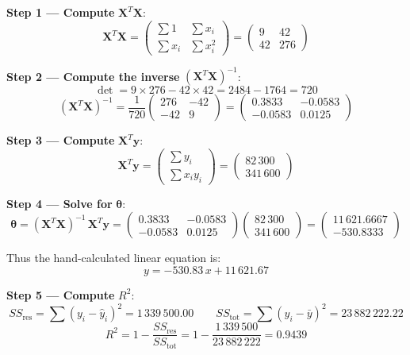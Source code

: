 \documentclass[12pt, a4paper]{article}
\begin{document}
\textbf{Step 1 --- Compute} $\mathbf{X}^T \mathbf{X}$:
\[
\mathbf{X}^T \mathbf{X} =
\begin{pmatrix}
\sum 1 & \sum x_i \\
\sum x_i & \sum x_i^2
\end{pmatrix}
=
\begin{pmatrix}
9 & 42 \\
42 & 276
\end{pmatrix}
\]

\textbf{Step 2 --- Compute the inverse} $(\mathbf{X}^T \mathbf{X})^{-1}$:
\[
\det = 9 \times 276 - 42 \times 42 = 2484 - 1764 = 720
\]
\[
(\mathbf{X}^T \mathbf{X})^{-1} =
\frac{1}{720}
\begin{pmatrix}
276 & -42 \\
-42 & 9
\end{pmatrix}
=
\begin{pmatrix}
0.3833 & -0.0583 \\
-0.0583 & 0.0125
\end{pmatrix}
\]

\textbf{Step 3 --- Compute} $\mathbf{X}^T \mathbf{y}$:
\[
\mathbf{X}^T \mathbf{y} =
\begin{pmatrix}
\sum y_i \\
\sum x_i y_i
\end{pmatrix}
=
\begin{pmatrix}
82\,300 \\
341\,600
\end{pmatrix}
\]

\textbf{Step 4 --- Solve for} $\boldsymbol{\theta}$:
\[
\boldsymbol{\theta} =
(\mathbf{X}^T \mathbf{X})^{-1}\,\mathbf{X}^T \mathbf{y}
=
\begin{pmatrix}
0.3833 & -0.0583 \\
-0.0583 & 0.0125
\end{pmatrix}
\begin{pmatrix}
82\,300 \\
341\,600
\end{pmatrix}
=
\begin{pmatrix}
11\,621.6667 \\
-530.8333
\end{pmatrix}
\]

Thus the hand-calculated linear equation is:
\[
\boxed{y = -530.83\,x + 11\,621.67}
\]

\textbf{Step 5 --- Compute} $R^2$:
\[
SS_{\text{res}} = \sum (y_i - \hat{y}_i)^2 = 1\,339\,500.00
\qquad
SS_{\text{tot}} = \sum (y_i - \bar{y})^2 = 23\,882\,222.22
\]
\[
R^2 = 1 - \frac{SS_{\text{res}}}{SS_{\text{tot}}} = 1 - \frac{1\,339\,500}{23\,882\,222} = \boxed{0.9439}
\]
\end{document}
